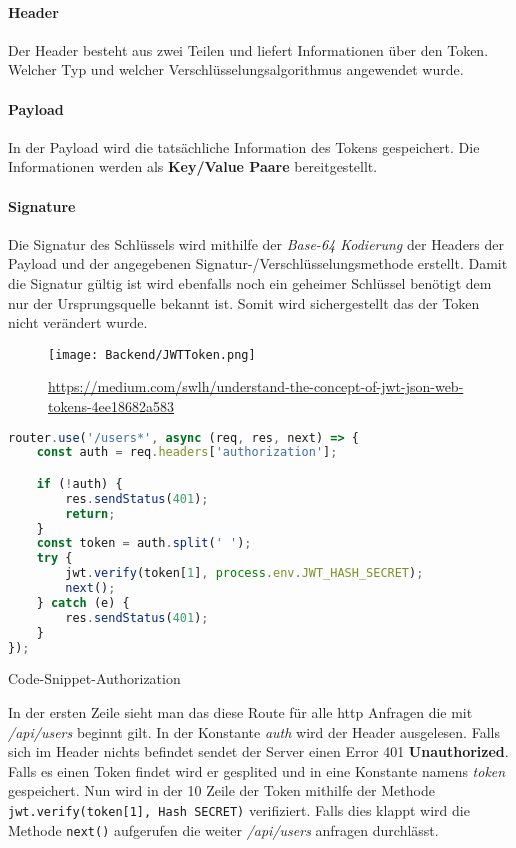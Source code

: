 \paragraph{Header}
Der Header besteht aus zwei Teilen und liefert Informationen über den Token. Welcher Typ und
welcher Verschlüsselungsalgorithmus angewendet wurde.

\paragraph{Payload}
In der Payload wird die tatsächliche Information des Tokens gespeichert. Die Informationen
werden als \textbf{Key/Value Paare} bereitgestellt.

\paragraph{Signature}
Die Signatur des Schlüssels wird mithilfe der \textit{Base-64 Kodierung} der Headers
der Payload und der angegebenen Signatur-/Verschlüsselungsmethode erstellt. Damit die Signatur
gültig ist wird ebenfalls noch ein geheimer Schlüssel benötigt dem nur der Ursprungsquelle bekannt
ist. Somit wird sichergestellt das der Token nicht verändert wurde.

\begin{figure}[H]
    \begin{center}
        \texttt{[image: Backend/JWTToken.png]}
    \end{center}
    \url{https://medium.com/swlh/understand-the-concept-of-jwt-json-web-tokens-4ee18682a583}
\end{figure}

\pagebreak


\begin{code}[htp]
    \begin{lstlisting}[firstnumber=1,language=JavaScript, style=CMD]
    router.use('/users*', async (req, res, next) => {
    const auth = req.headers['authorization'];

    if (!auth) {
        res.sendStatus(401);
        return;
    }
    const token = auth.split(' ');
    try {
        jwt.verify(token[1], process.env.JWT_HASH_SECRET);
        next();
    } catch (e) {
        res.sendStatus(401);
    }
});
    \end{lstlisting}
    \caption{Code-Snippet-Authorization}
\end{code}

In der ersten Zeile sieht man das diese Route für alle http Anfragen
die mit \textit{/api/users} beginnt gilt. In der Konstante \textit{auth}
wird der Header ausgelesen. Falls sich im Header nichts befindet sendet der
Server einen Error 401 \textbf{Unauthorized}. Falls es einen Token findet
wird er gesplited und in eine Konstante namens \textit{token} gespeichert.
Nun wird in der 10 Zeile der Token mithilfe der Methode \texttt{jwt.verify(token[1], Hash SECRET)}
verifiziert. Falls dies klappt wird die Methode \texttt{next()} aufgerufen die
weiter \textit{/api/users} anfragen durchlässt.


\cite{JWT}


